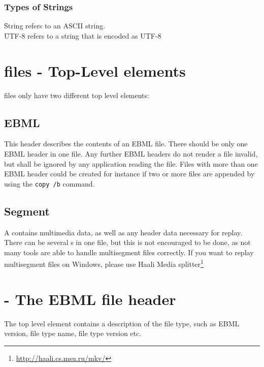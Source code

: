 \documentclass[12pt]{article}
\begin{document}
\subsubsection{Types of Strings}
\f{String} refers to an ASCII string.\\
\f{UTF-8} refers to a string that is encoded as UTF-8

\newpage

\section{\Matroska files - Top-Level elements}

\Matroska files only have two different top level elements:


\subsection{EBML}
This header describes the contents of an EBML file. There should be only one EBML
header in one file. Any further EBML headers do not render a file invalid,
but shall be ignored by any application reading the file. Files with more than one EBML header could be created for instance if two or more files are appended by using the \texttt{copy /b} command.
\subsection{Segment}
A  contains multimedia data, as well as any header data necessary for
replay. There can be several s in one \Matroska file, but this is not
encouraged to be done, as not many tools are able to handle multisegment \Matroska files correctly.
If you want to replay multisegment \Matroska files on Windows, please use Haali Media splitter\footnote{\url{http://haali.cs.msu.ru/mkv/}} 
\newpage
\section{ - The EBML file header}
The  top level element contains a description of the file type, such as EBML version, file type name, file type version etc. 

\end{document}
